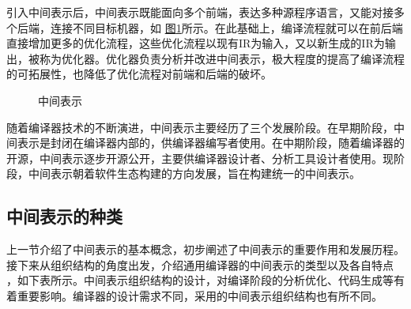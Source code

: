 \documentclass[letterpaper,10pt,english]{sphinxmanual}
\let\sphinxpxdimen\pdfpxdimen\else\newdimen\sphinxpxdimen
\begin{document}
\sphinxAtStartPar
引入中间表示后，中间表示既能面向多个前端，表达多种源程序语言，又能对接多个后端，连接不同目标机器，如
\hyperref[\detokenize{chapter_frontend_and_ir/intermediate_representation:intermediate-representation}]{图\ref{\detokenize{chapter_frontend_and_ir/intermediate_representation:intermediate-representation}}}所示。在此基础上，编译流程就可以在前后端直接增加更多的优化流程，这些优化流程以现有IR为输入，又以新生成的IR为输出，被称为优化器。优化器负责分析并改进中间表示，极大程度的提高了编译流程的可拓展性，也降低了优化流程对前端和后端的破坏。

\begin{figure}[H]
\centering
\capstart

\noindent\sphinxincludegraphics[width=850\sphinxpxdimen]{{中间表示-中间表示结构}.png}
\caption{中间表示}\label{\detokenize{chapter_frontend_and_ir/intermediate_representation:id12}}\label{\detokenize{chapter_frontend_and_ir/intermediate_representation:intermediate-representation}}\end{figure}

\sphinxAtStartPar
随着编译器技术的不断演进，中间表示主要经历了三个发展阶段。在早期阶段，中间表示是封闭在编译器内部的，供编译器编写者使用。在中期阶段，随着编译器的开源，中间表示逐步开源公开，主要供编译器设计者、分析工具设计者使用。现阶段，中间表示朝着软件生态构建的方向发展，旨在构建统一的中间表示。


\subsection{中间表示的种类}
\label{\detokenize{chapter_frontend_and_ir/intermediate_representation:id3}}
\sphinxAtStartPar
上一节介绍了中间表示的基本概念，初步阐述了中间表示的重要作用和发展历程。接下来从组织结构的角度出发，介绍通用编译器的中间表示的类型以及各自特点
，如下表所示。中间表示组织结构的设计，对编译阶段的分析优化、代码生成等有着重要影响。编译器的设计需求不同，采用的中间表示组织结构也有所不同。
\end{document}
